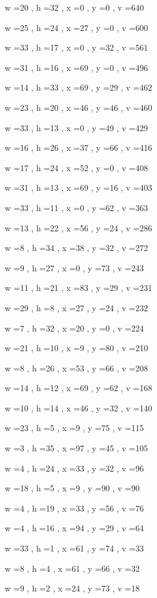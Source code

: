 \documentclass[11pt]{article}
\begin{document}
w =20 , h =32 , x =0 , y =0 , v =640
\par
w =25 , h =24 , x =27 , y =0 , v =600
\par
w =33 , h =17 , x =0 , y =32 , v =561
\par
w =31 , h =16 , x =69 , y =0 , v =496
\par
w =14 , h =33 , x =69 , y =29 , v =462
\par
w =23 , h =20 , x =46 , y =46 , v =460
\par
w =33 , h =13 , x =0 , y =49 , v =429
\par
w =16 , h =26 , x =37 , y =66 , v =416
\par
w =17 , h =24 , x =52 , y =0 , v =408
\par
w =31 , h =13 , x =69 , y =16 , v =403
\par
w =33 , h =11 , x =0 , y =62 , v =363
\par
w =13 , h =22 , x =56 , y =24 , v =286
\par
w =8 , h =34 , x =38 , y =32 , v =272
\par
w =9 , h =27 , x =0 , y =73 , v =243
\par
w =11 , h =21 , x =83 , y =29 , v =231
\par
w =29 , h =8 , x =27 , y =24 , v =232
\par
w =7 , h =32 , x =20 , y =0 , v =224
\par
w =21 , h =10 , x =9 , y =80 , v =210
\par
w =8 , h =26 , x =53 , y =66 , v =208
\par
w =14 , h =12 , x =69 , y =62 , v =168
\par
w =10 , h =14 , x =46 , y =32 , v =140
\par
w =23 , h =5 , x =9 , y =75 , v =115
\par
w =3 , h =35 , x =97 , y =45 , v =105
\par
w =4 , h =24 , x =33 , y =32 , v =96
\par
w =18 , h =5 , x =9 , y =90 , v =90
\par
w =4 , h =19 , x =33 , y =56 , v =76
\par
w =4 , h =16 , x =94 , y =29 , v =64
\par
w =33 , h =1 , x =61 , y =74 , v =33
\par
w =8 , h =4 , x =61 , y =66 , v =32
\par
w =9 , h =2 , x =24 , y =73 , v =18
\par
\newpage
\end{document}
